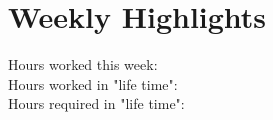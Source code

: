 \documentclass[main.tex]{subfiles}
\begin{document}

\section{Weekly Highlights}
Hours worked this week: \DisplayWeeklyHours{}\\
\AddLifeTimeHours{}
\ResetWeeklyHours{}
Hours worked in "life time": \DisplayLifeTimeHours{}\\
\AddRequiredHours{}
Hours required in "life time": \DisplayHoursRequired{}
\clearpage
\end{document}
